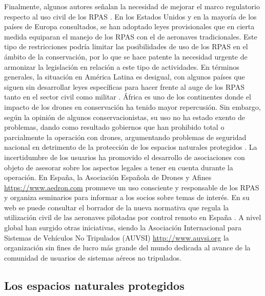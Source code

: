 \documentclass[onecolumn]{extarticle}
\begin{document}
Finalmente, algunos autores señalan la necesidad de mejorar el marco
regulatorio respecto al uso civil de los RPAS \citep{Nugraha2016}. En
los Estados Unidos y en la mayoría de los países de Europa consultados,
se han adoptado leyes provisionales que en cierta medida equiparan el
manejo de los RPAS con el de aeronaves tradicionales. Este tipo de
restricciones podría limitar las posibilidades de uso de los RPAS en el
ámbito de la conservación, por lo que se hace patente la necesidad
urgente de armonizar la legislación en relación a este tipo de
actividades. En términos generales, la situación en América Latina es
desigual, con algunos países que siguen sin desarrollar leyes
específicas para hacer frente al auge de los RPAS tanto en el sector
civil como militar \citep{Nacion2013}. África es uno de los continentes
donde el impacto de los drones en conservación ha tenido mayor
repercusión. Sin embargo, según la opinión de algunos conservacionistas,
su uso no ha estado exento de problemas, dando como resultado gobiernos
que han prohibido total o parcialmente la operación con drones,
argumentando problemas de seguridad nacional en detrimento de la
protección de los espacios naturales protegidos \citep{Andrews2014}. La
incertidumbre de los usuarios ha promovido el desarrollo de asociaciones
con objeto de asesorar sobre los aspectos legales a tener en cuenta
durante la operación. En España, la Asociación Española de Drones y
Afines \url{https://www.aedron.com} promueve un uso consciente y
responsable de los RPAS y organiza seminarios para informar a los socios
sobre temas de interés. En su web se puede consultar el borrador de la
nueva normativa que regula la utilización civil de las aeronaves
pilotadas por control remoto en España \citep{Aedron2017}. A nivel
global han surgido otras iniciativas, siendo la Asociación Internacional
para Sistemas de Vehículos No Tripulados (AUVSI)
\url{http://www.auvsi.org} la organización sin fines de lucro más grande
del mundo dedicada al avance de la comunidad de usuarios de sistemas
aéreos no tripulados.

\subsection{Los espacios naturales
protegidos}\label{los-espacios-naturales-protegidos}
\end{document}

